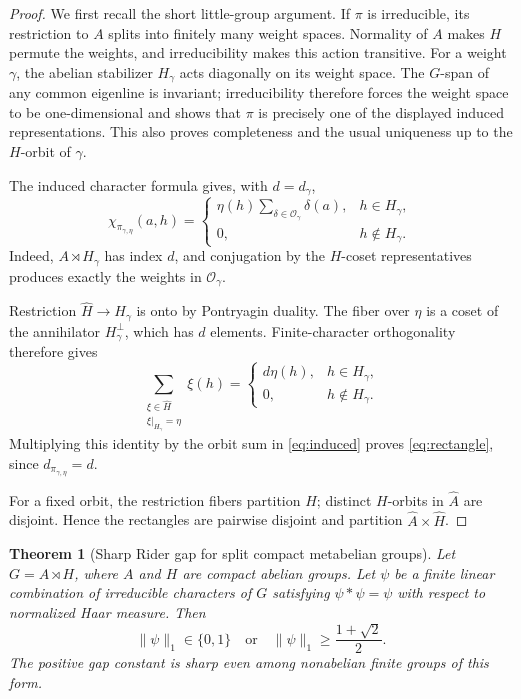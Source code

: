 \documentclass[11pt]{article}
\newtheorem{theorem}{Theorem}
\newcommand{\1}{\mathbf 1}
\newcommand{\norm}[1]{\lVert #1\rVert}
\begin{document}
\begin{proof}
We first recall the short little-group argument.  If $\pi$ is irreducible, its
restriction to $A$ splits into finitely many weight spaces.  Normality of $A$ makes
$H$ permute the weights, and irreducibility makes this action transitive.  For a
weight $\gamma$, the abelian stabilizer $H_\gamma$ acts diagonally on its weight
space.  The $G$-span of any common eigenline is invariant; irreducibility therefore
forces the weight space to be one-dimensional and shows that $\pi$ is precisely one
of the displayed induced representations.  This also proves completeness and the
usual uniqueness up to the $H$-orbit of $\gamma$.

The induced character formula gives, with $d=d_\gamma$,
\begin{equation}\label{eq:induced}
 \chi_{\pi_{\gamma,\eta}}(a,h)
 =\begin{cases}
   \eta(h)\displaystyle\sum_{\delta\in\mathcal O_\gamma}\delta(a),&h\in H_\gamma,\\[5pt]
   0,&h\notin H_\gamma.
  \end{cases}
\end{equation}
Indeed, $A\rtimes H_\gamma$ has index $d$, and conjugation by the $H$-coset
representatives produces exactly the weights in $\mathcal O_\gamma$.

Restriction $\widehat H\to\widehat{H_\gamma}$ is onto by Pontryagin duality.
The fiber over $\eta$ is a coset of the annihilator $H_\gamma^\perp$, which has
$d$ elements.  Finite-character orthogonality therefore gives
\[
 \sum_{\substack{\xi\in\widehat H\\ \xi|_{H_\gamma}=\eta}}\xi(h)
 =\begin{cases}d\eta(h),&h\in H_\gamma,\\0,&h\notin H_\gamma.\end{cases}
\]
Multiplying this identity by the orbit sum in \eqref{eq:induced} proves
\eqref{eq:rectangle}, since $d_{\pi_{\gamma,\eta}}=d$.

For a fixed orbit, the restriction fibers partition $\widehat H$; distinct
$H$-orbits in $\widehat A$ are disjoint.  Hence the rectangles are pairwise
disjoint and partition $\widehat A\times\widehat H$.
\end{proof}

\begin{theorem}[Sharp Rider gap for split compact metabelian groups]\label{thm:main}
Let $G=A\rtimes H$, where $A$ and $H$ are compact abelian groups.  Let $\psi$ be a
finite linear combination of irreducible characters of $G$ satisfying
$\psi*\psi=\psi$ with respect to normalized Haar measure.  Then
\[
 \norm{\psi}_1\in\{0,1\}\quad\text{or}\quad
 \norm{\psi}_1\geq\frac{1+\sqrt2}{2}.
\]
The positive gap constant is sharp even among nonabelian finite groups of this form.
\end{theorem}
\end{document}
